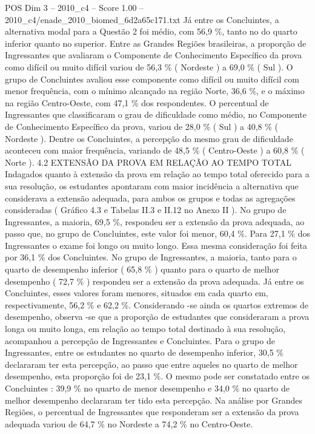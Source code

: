 \begin{textsample}{POS Dim 3 – 2010\_c4 – Score 1.00 – 2010\_c4/enade\_2010\_biomed\_6d2a65c171.txt}
Já entre os Concluintes, a alternativa modal para a Questão 2 foi médio, com 56,9 \%, tanto no do quarto inferior quanto no superior.
Entre as Grandes Regiões brasileiras, a proporção de Ingressantes que avaliaram o Componente de Conhecimento Específico da prova como difícil ou muito difícil variou de 56,3 \% ( Nordeste ) a 69,0 \% ( Sul ).
O grupo de Concluintes avaliou esse componente como difícil ou muito difícil com menor frequência, com o mínimo alcançado na região Norte, 36,6 \%, e o máximo na região Centro-Oeste, com 47,1 \% dos respondentes.
O percentual de Ingressantes que classificaram o grau de dificuldade como médio, no Componente de Conhecimento Específico da prova, variou de 28,0 \% ( Sul ) a 40,8 \% ( Nordeste ).
Dentre os Concluintes, a percepção do mesmo grau de dificuldade aconteceu com maior frequência, variando de 48,5 \% ( Centro-Oeste ) a 60,8 \% ( Norte ). 4.2 EXTENSÃO DA PROVA EM RELAÇÃO AO TEMPO TOTAL Indagados quanto à extensão da prova em relação ao tempo total oferecido para a sua resolução, os estudantes apontaram com maior incidência a alternativa que considerava a extensão adequada, para ambos os grupos e todas as agregações consideradas ( Gráfico 4.3 e Tabelas II.3 e II.12 no Anexo II ).
No grupo de Ingressantes, a maioria, 69,5 \%, respondeu ser a extensão da prova adequada, ao passo que, no grupo de Concluintes, este valor foi menor, 60,4 \%.
Para 27,1 \% dos Ingressantes o exame foi longo ou muito longo.
Essa mesma consideração foi feita por 36,1 \% dos Concluintes.
No grupo de Ingressantes, a maioria, tanto para o quarto de desempenho inferior ( 65,8 \% ) quanto para o quarto de melhor desempenho ( 72,7 \% ) respondeu ser a extensão da prova adequada.
Já entre os Concluintes, esses valores foram menores, situados em cada quarto em, respectivamente, 56,2 \% e 62,2 \%.
Considerando -se ainda os quartos extremos de desempenho, observa -se que a proporção de estudantes que consideraram a prova longa ou muito longa, em relação ao tempo total destinado à sua resolução, acompanhou a percepção de Ingressantes e Concluintes.
Para o grupo de Ingressantes, entre os estudantes no quarto de desempenho inferior, 30,5 \% declararam ter esta percepção, ao passo que entre aqueles no quarto de melhor desempenho, esta proporção foi de 23,1 \%.
O mesmo pode ser constatado entre os Concluintes : 39,9 \% no quarto de menor desempenho e 34,0 \% no quarto de melhor desempenho declararam ter tido esta percepção.
Na análise por Grandes Regiões, o percentual de Ingressantes que responderam ser a extensão da prova adequada variou de 64,7 \% no Nordeste a 74,2 \% no Centro-Oeste.

\end{textsample}
